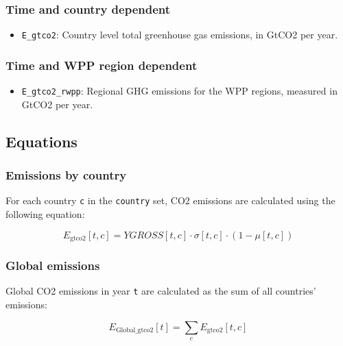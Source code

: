 \documentclass[
]{article}
\providecommand{\tightlist}{%
  \setlength{\itemsep}{0pt}\setlength{\parskip}{0pt}}
\begin{document}
\subsubsection{Time and country
dependent}\label{time-and-country-dependent-5}

\begin{itemize}
\tightlist
\item
  \texttt{E\_gtco2}: Country level total greenhouse gas emissions, in
  GtCO2 per year.
\end{itemize}

\subsubsection{Time and WPP region
dependent}\label{time-and-WPP-region-dependent}

\begin{itemize}
\tightlist
\item
  \texttt{E\_gtco2\_rwpp}: Regional GHG emissions for the WPP regions, measured in GtCO2 per year.
\end{itemize}

\subsection{Equations}\label{equations-2}

\subsubsection{Emissions by country}\label{emissions-by-country}

For each country \texttt{c} in the \texttt{country} set, CO2 emissions
are calculated using the following equation:

\begin{equation}
 E_{\text{gtco2}}[t,c] = YGROSS[t,c] \cdot \sigma[t,c] \cdot (1-\mu[t,c]) 
\end{equation}


\subsubsection{Global emissions}\label{global-emissions}

Global CO2 emissions in year \texttt{t} are calculated as the sum of all
countries' emissions:

\begin{equation}
 E_{\text{Global\_gtco2}}[t] = \sum_{c} E_{\text{gtco2}}[t,c] 
\end{equation}
\end{document}
